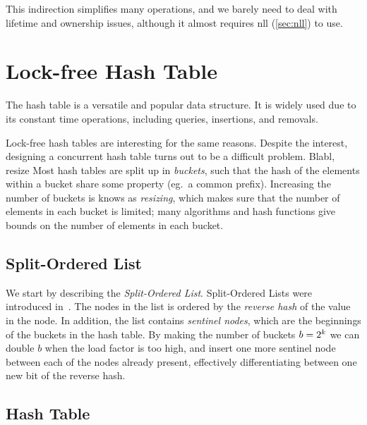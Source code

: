 This indirection simplifies many operations, and we barely need to deal with lifetime and ownership
issues, although it almost requires \gls{nll} (\cref{sec:nll}) to use.

\begin{figure}[ht]

\end{figure}







\section{Lock-free Hash Table}

The hash table is a versatile and popular data structure. It is widely used due to its constant time
operations, including queries, insertions, and removals.

Lock-free hash tables are interesting for the same reasons. Despite the interest, designing a
concurrent hash table turns out to be a difficult problem. Blabl, resize
Most hash tables are split up in \emph{buckets}, such that the hash of the elements within a bucket
share some property (eg.\ a common prefix). Increasing the number of buckets is knows as
\emph{resizing}, which makes sure that the number of elements in each bucket is limited; many
algorithms and hash functions give bounds on the number of elements in each bucket.

\subsection{Split-Ordered List}

We start by describing the \emph{Split-Ordered List}. Split-Ordered Lists were introduced
in~\cite{shalev2006split}. The nodes in the list is ordered by the \emph{reverse hash} of the value
in the node. In addition, the list contains \emph{sentinel nodes}, which are the beginnings of the
buckets in the hash table. By making the number of buckets $b=2\sp{k}$ we can double $b$ when the
load factor is too high, and insert one more sentinel node between each of the nodes already
present, effectively differentiating between one new bit of the reverse hash.

\subsection{Hash Table}

